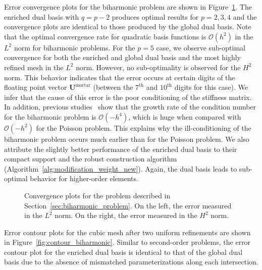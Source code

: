 Error convergence plots for the biharmonic problem are shown in Figure~\ref{fig:convergence_biharmonic}. The enriched dual basis with $q=p-2$ produces optimal results for $p=2,3,4$ and the convergence plots are identical to those produced by the global dual basis. Note that the optimal convergence rate for quadratic basis functions is $\mathcal{O}(h^2)$ in the $L^2$ norm for biharmonic problems. For the $p=5$ case, we observe sub-optimal convergence for both the enriched and global dual basis and the most highly refined mesh in the $L^2$ norm. However, no sub-optimality is observed for the $H^2$ norm. This behavior indicates that the error occurs at certain digits of the floating point vector $\mathbf{U}^\text{mortar}$ (between the $7^\text{th}$ and $10^\text{th}$ digits for this case). We infer that the cause of this error is the poor conditioning of the stiffness matrix. In addition, previous studies~\cite{li2008effective} show that the growth rate of the condition number for the biharmonic problem is $\mathcal{O}(-h^4)$, which is huge when compared with $\mathcal{O}(-h^2)$ for the Poisson problem. This explains why the ill-conditioning of the biharmonic problem occurs much earlier than for the Poisson problem. We also attribute the slightly better performance of the enriched dual basis to their compact support and the robust construction algorithm (Algorithm~\ref{alg:modification_weight_new}). Again, the \Bezier dual basis leads to sub-optimal behavior for higher-order elements.\par

\begin{figure}
	\center
	\captionsetup[subfigure]{labelformat=empty}
	\begin{subfigure}{.45\textwidth}
		\center
		
	\end{subfigure}\hspace{2mm}
	\begin{subfigure}{.45\textwidth}
		\center
		
	\end{subfigure}
	\caption{Convergence plots for the problem described in Section~\ref{sec:biharmonic_problem}. On the left, the error measured in the $L^2$ norm. On the right, the error measured in the $H^2$ norm.}\label{fig:convergence_biharmonic}
\end{figure}

Error contour plots for the cubic mesh after two uniform refinements are shown in Figure~\ref{fig:contour_biharmonic}. Similar to second-order problems, the error contour plot for the enriched dual basis is identical to that of the global dual basis due to the absence of mismatched parameterizations along each intersection.

